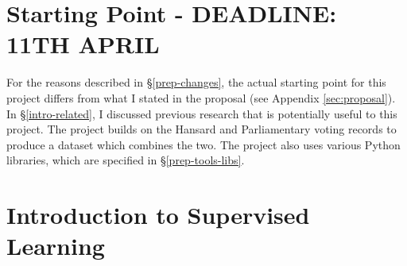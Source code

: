\documentclass[12pt,a4paper,twoside,openright]{report}
\begin{document}
\section{Starting Point - DEADLINE: 11TH APRIL} \label{prep-start}
For the reasons described in \S\ref{prep-changes}, the actual starting point for this project differs from what I stated in the proposal (see Appendix \ref{sec:proposal}). In \S\ref{intro-related}, I discussed previous research that is potentially useful to this project. The project builds on the Hansard \cite{hansard} and Parliamentary voting records to produce a dataset which combines the two. The project also uses various Python libraries, which are specified in \S\ref{prep-tools-libs}.
\section{Introduction to Supervised Learning} \label{prep-supervised} \label{supervised-learning}
\end{document}
